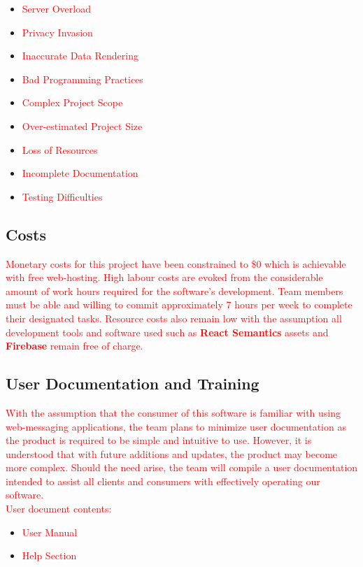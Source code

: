 \documentclass[12pt, titlepage]{article}
\begin{document}
    	\begin{itemize}
    		\item \textcolor{red}{Server Overload}
    		\item \textcolor{red}{Privacy Invasion}
    		\item \textcolor{red}{Inaccurate Data Rendering}
    		\item \textcolor{red}{Bad Programming Practices}
    		\item \textcolor{red}{Complex Project Scope}
    		\item \textcolor{red}{Over-estimated Project Size}
    		\item \textcolor{red}{Loss of Resources}
    		\item \textcolor{red}{Incomplete Documentation}
    		\item \textcolor{red}{Testing Difficulties}
    	\end{itemize}

    	\subsection{Costs}
    \textcolor{red}{Monetary costs for this project have been constrained to \$0 which is achievable with free web-hosting. High labour costs are evoked from the considerable amount of work hours required for the software's development. Team members must be able and willing to commit approximately 7 hours per week to complete their designated tasks. Resource costs also remain low with the assumption all development tools and software used such as \textbf{React Semantics} assets and \textbf{Firebase} remain free of charge.}
    	
    	\subsection{User Documentation and Training}
    	\textcolor{red}{With the assumption that the consumer of this software is familiar with using web-messaging applications, the team plans to minimize user documentation as the product is required to be simple and intuitive to use. However, it is understood that with future additions and updates, the product may become more complex. Should the need arise, the team will compile a user documentation intended to assist all clients and consumers with effectively operating our software.}\\
    	
    	\textcolor{red}{User document contents:}\\
    	\begin{itemize}
    
    		\item \textcolor{red}{User Manual}
    		\item \textcolor{red}{Help Section}
    	\end{itemize}
\end{document}
